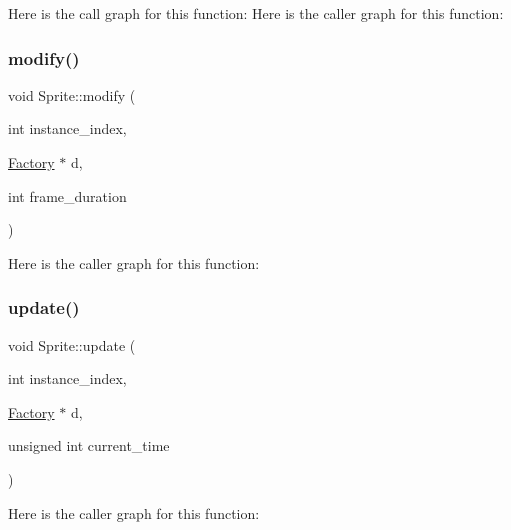 Here is the call graph for this function\+:
Here is the caller graph for this function\+:
\mbox{\label{namespace_sprite_aa072b202c13fc1b75f6ff8d2f27f809f}} 
\subsubsection{\texorpdfstring{modify()}{modify()}}
{\footnotesize\ttfamily void Sprite\+::modify (\begin{DoxyParamCaption}\item[{int}]{instance\+\_\+index,  }\item[{\mbox{\hyperlink{struct_sprite_1_1_factory}{Factory}} $\ast$}]{d,  }\item[{int}]{frame\+\_\+duration }\end{DoxyParamCaption})}

Here is the caller graph for this function\+:
\mbox{\label{namespace_sprite_a9e17de977c6af3ca729ad222c11a8547}} 
\subsubsection{\texorpdfstring{update()}{update()}}
{\footnotesize\ttfamily void Sprite\+::update (\begin{DoxyParamCaption}\item[{int}]{instance\+\_\+index,  }\item[{\mbox{\hyperlink{struct_sprite_1_1_factory}{Factory}} $\ast$}]{d,  }\item[{unsigned int}]{current\+\_\+time }\end{DoxyParamCaption})}

Here is the caller graph for this function\+:
